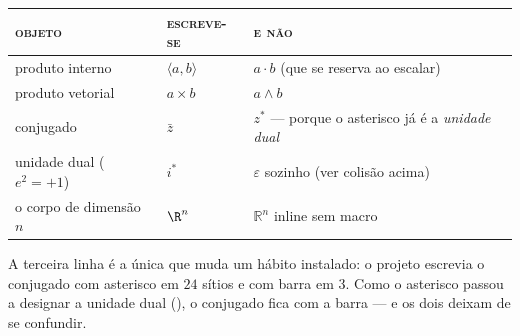 \begin{center}\small
\renewcommand{\arraystretch}{1.2}
\begin{tabular}{@{}p{4.4cm}p{4.0cm}p{6.0cm}@{}}
\toprule
\textsc{objeto} & \textsc{escreve-se} & \textsc{e não} \\
\midrule
produto interno & $\langle a,b\rangle$ & $a\cdot b$ (que se reserva ao escalar) \\
produto vetorial & $a\times b$ & $a\wedge b$ \\
conjugado & $\bar z$ & $z^*$ --- porque o asterisco já é a \emph{unidade dual} \\
unidade dual ($e^2=+1$) & $i^*$ & $\varepsilon$ sozinho (ver colisão acima) \\
o corpo de dimensão $n$ & $\R^n$ & $\mathbb{R}^{n}$ inline sem macro \\
\bottomrule
\end{tabular}
\end{center}

\noindent A terceira linha é a única que muda um hábito instalado: o projeto escrevia o conjugado
com asterisco em $24$ sítios e com barra em $3$. Como o asterisco passou a designar a unidade dual
(), o conjugado fica com a barra --- e os dois deixam de se confundir.
